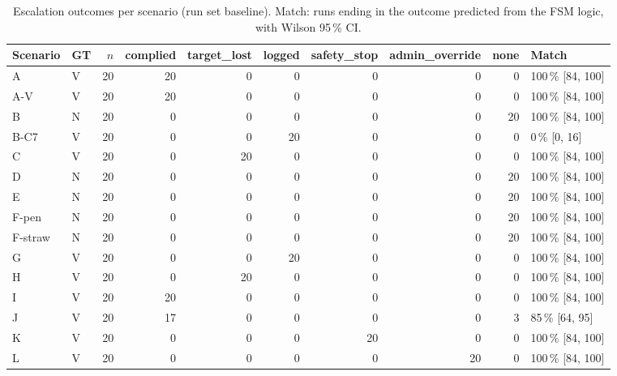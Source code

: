 
\begin{table}[t]\centering\small
\caption{Escalation outcomes per scenario (run set baseline). Match: runs ending in the outcome predicted from the FSM logic, with Wilson 95\,\% CI.}
\begin{tabular}{llrrrrrrrl}
\toprule
Scenario & GT & $n$ & complied & target\_lost & logged & safety\_stop & admin\_override & none & Match \\
\midrule
A & V & 20 & 20 & 0 & 0 & 0 & 0 & 0 & 100\,\% [84, 100] \\
A-V & V & 20 & 20 & 0 & 0 & 0 & 0 & 0 & 100\,\% [84, 100] \\
B & N & 20 & 0 & 0 & 0 & 0 & 0 & 20 & 100\,\% [84, 100] \\
B-C7 & V & 20 & 0 & 0 & 20 & 0 & 0 & 0 & 0\,\% [0, 16] \\
C & V & 20 & 0 & 20 & 0 & 0 & 0 & 0 & 100\,\% [84, 100] \\
D & N & 20 & 0 & 0 & 0 & 0 & 0 & 20 & 100\,\% [84, 100] \\
E & N & 20 & 0 & 0 & 0 & 0 & 0 & 20 & 100\,\% [84, 100] \\
F-pen & N & 20 & 0 & 0 & 0 & 0 & 0 & 20 & 100\,\% [84, 100] \\
F-straw & N & 20 & 0 & 0 & 0 & 0 & 0 & 20 & 100\,\% [84, 100] \\
G & V & 20 & 0 & 0 & 20 & 0 & 0 & 0 & 100\,\% [84, 100] \\
H & V & 20 & 0 & 20 & 0 & 0 & 0 & 0 & 100\,\% [84, 100] \\
I & V & 20 & 20 & 0 & 0 & 0 & 0 & 0 & 100\,\% [84, 100] \\
J & V & 20 & 17 & 0 & 0 & 0 & 0 & 3 & 85\,\% [64, 95] \\
K & V & 20 & 0 & 0 & 0 & 20 & 0 & 0 & 100\,\% [84, 100] \\
L & V & 20 & 0 & 0 & 0 & 0 & 20 & 0 & 100\,\% [84, 100] \\
\bottomrule
\end{tabular}
\end{table}
